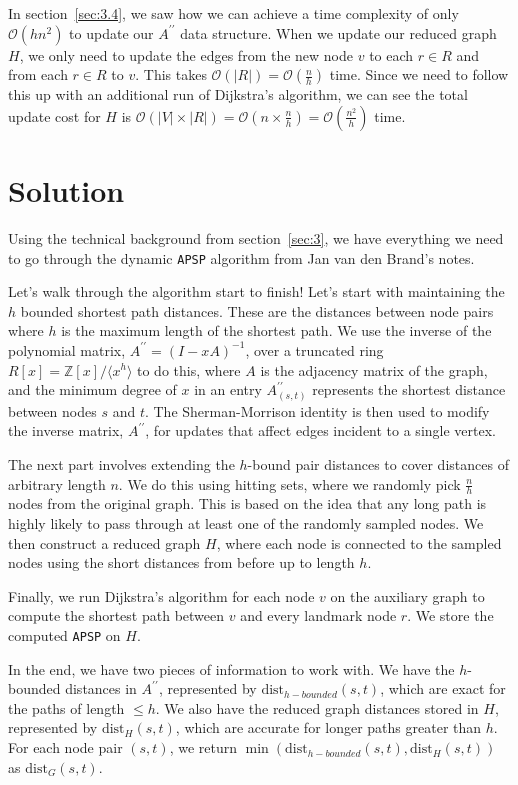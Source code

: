 \documentclass[12pt]{article}
\newcommand{\bigO}{\mathcal{O}}
\begin{document}
In section~\ref{sec:3.4}, we saw how we can achieve a time complexity of only $\bigO(h n^2)$ to update our $A^{\prime \prime}$ data structure. When we update our reduced graph $H$, we only need to update the edges from the new node $v$ to each $r \in R$ and from each $r \in R$ to $v$. This takes $\bigO(|R|) = \bigO(\frac{n}{h})$ time. Since we need to follow this up with an additional run of Dijkstra's algorithm, we can see the total update cost for $H$ is $\bigO(|V| \times |R|) = \bigO(n \times \frac{n}{h}) = \bigO(\frac{n^2}{h})$ time.

\section{Solution} \label{sec:4}

Using the technical background from section~\ref{sec:3}, we have everything we need to go through the dynamic \texttt{APSP} algorithm from Jan van den Brand's notes.

Let's walk through the algorithm start to finish! Let's start with maintaining the $h$ bounded shortest path distances. These are the distances between node pairs where $h$ is the maximum length of the shortest path. We use the inverse of the polynomial matrix, $A^{\prime \prime} = (I - xA)^{-1}$, over a truncated ring $R[x] = \mathds{Z}[x] / \langle x^h \rangle$ to do this, where $A$ is the adjacency matrix of the graph, and the minimum degree of $x$ in an entry $A^{\prime \prime}_{(s, t)}$ represents the shortest distance between nodes $s$ and $t$. The Sherman-Morrison identity is then used to modify the inverse matrix, $A^{\prime \prime}$, for updates that affect edges incident to a single vertex.

The next part involves extending the $h$-bound pair distances to cover distances of arbitrary length $n$. We do this using hitting sets, where we randomly pick $\frac{n}{h}$ nodes from the original graph. This is based on the idea that any long path is highly likely to pass through at least one of the randomly sampled nodes. We then construct a reduced graph $H$, where each node is connected to the sampled nodes using the short distances from before up to length $h$.

Finally, we run Dijkstra's algorithm for each node $v$ on the auxiliary graph to compute the shortest path between $v$ and every landmark node $r$. We store the computed \texttt{APSP} on $H$.

In the end, we have two pieces of information to work with. We have the $h$-bounded distances in $A^{\prime \prime}$, represented by $\mathrm{dist}_{h-bounded}(s, t)$, which are exact for the paths of length $\leq h$. We also have the reduced graph distances stored in $H$, represented by $\mathrm{dist}_H(s, t)$, which are accurate for longer paths greater than $h$. For each node pair $(s, t)$, we return $\min({\mathrm{dist}_{h-bounded}(s, t), \mathrm{dist}_H(s, t)})$ as $\mathrm{dist}_G(s, t)$.
\end{document}
